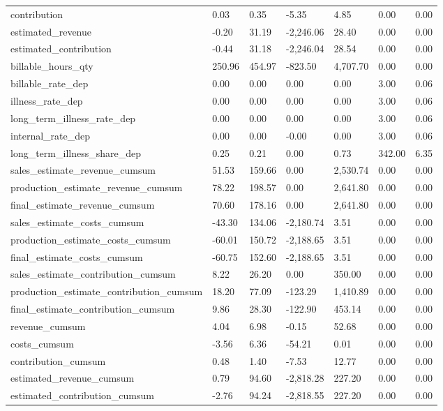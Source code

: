 \begin{landscape}
\begin{longtable}[h!]{lllllll}
contribution & 0.03 & 0.35 & -5.35 & 4.85 & 0.00 & 0.00 \\
estimated_revenue & -0.20 & 31.19 & -2,246.06 & 28.40 & 0.00 & 0.00 \\
estimated_contribution & -0.44 & 31.18 & -2,246.04 & 28.54 & 0.00 & 0.00 \\
billable_hours_qty & 250.96 & 454.97 & -823.50 & 4,707.70 & 0.00 & 0.00 \\
billable_rate_dep & 0.00 & 0.00 & 0.00 & 0.00 & 3.00 & 0.06 \\
illness_rate_dep & 0.00 & 0.00 & 0.00 & 0.00 & 3.00 & 0.06 \\
long_term_illness_rate_dep & 0.00 & 0.00 & 0.00 & 0.00 & 3.00 & 0.06 \\
internal_rate_dep & 0.00 & 0.00 & -0.00 & 0.00 & 3.00 & 0.06 \\
long_term_illness_share_dep & 0.25 & 0.21 & 0.00 & 0.73 & 342.00 & 6.35 \\
sales_estimate_revenue_cumsum & 51.53 & 159.66 & 0.00 & 2,530.74 & 0.00 & 0.00 \\
production_estimate_revenue_cumsum & 78.22 & 198.57 & 0.00 & 2,641.80 & 0.00 & 0.00 \\
final_estimate_revenue_cumsum & 70.60 & 178.16 & 0.00 & 2,641.80 & 0.00 & 0.00 \\
sales_estimate_costs_cumsum & -43.30 & 134.06 & -2,180.74 & 3.51 & 0.00 & 0.00 \\
production_estimate_costs_cumsum & -60.01 & 150.72 & -2,188.65 & 3.51 & 0.00 & 0.00 \\
final_estimate_costs_cumsum & -60.75 & 152.60 & -2,188.65 & 3.51 & 0.00 & 0.00 \\
sales_estimate_contribution_cumsum & 8.22 & 26.20 & 0.00 & 350.00 & 0.00 & 0.00 \\
production_estimate_contribution_cumsum & 18.20 & 77.09 & -123.29 & 1,410.89 & 0.00 & 0.00 \\
final_estimate_contribution_cumsum & 9.86 & 28.30 & -122.90 & 453.14 & 0.00 & 0.00 \\
revenue_cumsum & 4.04 & 6.98 & -0.15 & 52.68 & 0.00 & 0.00 \\
costs_cumsum & -3.56 & 6.36 & -54.21 & 0.01 & 0.00 & 0.00 \\
contribution_cumsum & 0.48 & 1.40 & -7.53 & 12.77 & 0.00 & 0.00 \\
estimated_revenue_cumsum & 0.79 & 94.60 & -2,818.28 & 227.20 & 0.00 & 0.00 \\
estimated_contribution_cumsum & -2.76 & 94.24 & -2,818.55 & 227.20 & 0.00 & 0.00 \\

\end{longtable}
\end{landscape}

